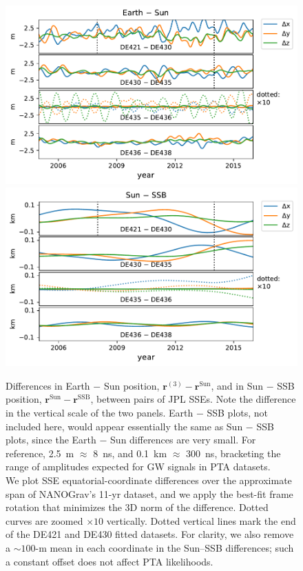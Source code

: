 \documentclass[iop,apj,twocolappendix]{emulateapj}
\begin{document}
\begin{figure}[t]
    \centering
    \includegraphics[width=\columnwidth]{figures/EarthSunDiff.pdf}
    \includegraphics[width=\columnwidth]{figures/SunSSBDiff.pdf}
    \caption{Differences in Earth $-$ Sun position, $\mathbf{r}^{(3)} - \mathbf{r}^\mathrm{Sun}$, and in Sun $-$ SSB position, $\mathbf{r}^\mathrm{Sun} - \mathbf{r}^\mathrm{SSB}$, between pairs of JPL SSEs. Note the difference in the vertical scale of the two panels.
    Earth $-$ SSB plots, not included here, would appear essentially the same as Sun $-$ SSB plots, since the Earth $-$ Sun differences are very small. For reference, 2.5~m $\approx$ 8~ns, and 0.1~km $\approx$ 300~ns, bracketing the range of amplitudes expected for GW signals in PTA datasets. \\
    We plot SSE equatorial-coordinate differences over the approximate span of NANOGrav's 11-yr dataset, and we apply the best-fit frame rotation that minimizes the 3D norm of the difference. Dotted curves are zoomed $\times 10$ vertically. Dotted vertical lines mark the end of the DE421 and DE430 fitted datasets.
    For clarity, we also remove a $\sim 100$-m mean in each coordinate in the Sun--SSB differences; such a constant offset does not affect PTA likelihoods.
    \label{fig:earthsun}}
\end{figure}
\end{document}
